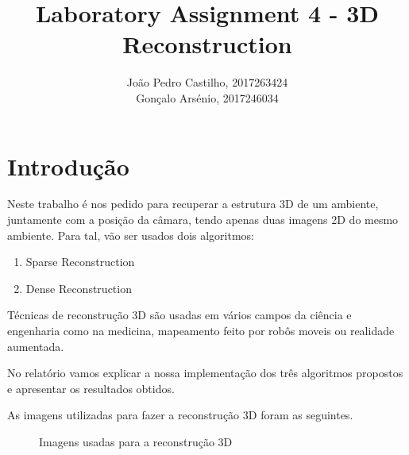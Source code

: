 \documentclass[journal]{IEEEtran}
\begin{document}
\title{Laboratory Assignment 4 - 3D Reconstruction}
\author{João Pedro Castilho, 2017263424\\
        Gonçalo Arsénio, 2017246034}
\maketitle
\IEEEpeerreviewmaketitle
\section{Introdução}
Neste trabalho é nos pedido para recuperar a estrutura 3D de um ambiente, juntamente com a posição da câmara, tendo apenas duas imagens 2D do mesmo ambiente. Para tal, vão ser usados dois algoritmos:
\begin{enumerate}
    \item Sparse Reconstruction
    \item Dense Reconstruction
\end{enumerate}
\par Técnicas de reconstrução 3D são usadas em vários campos da ciência e engenharia como na medicina, mapeamento feito por robôs moveis ou realidade aumentada.
\par No relatório vamos explicar a nossa implementação dos três algoritmos propostos e apresentar os resultados obtidos.
\par As imagens utilizadas para fazer a reconstrução 3D foram as seguintes.
\begin{figure}[H]
        \centering
        \qquad
        \caption{Imagens usadas para a reconstrução 3D}
        \label{fig:3}
\end{figure}
\end{document}
